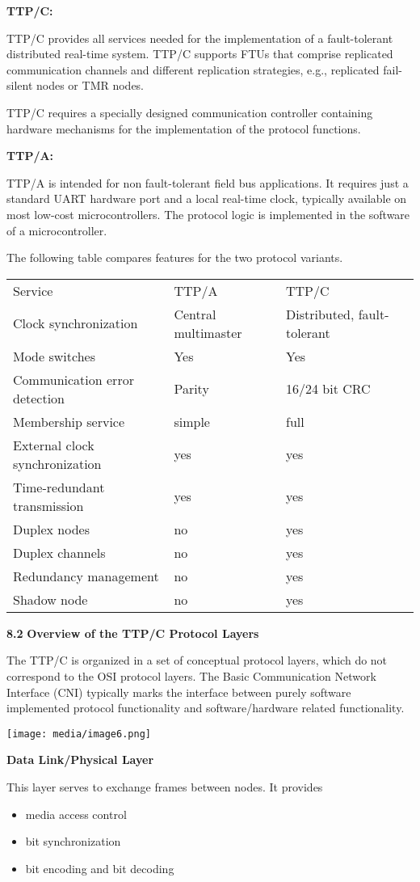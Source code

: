 \textbf{TTP/C:}

TTP/C provides all services needed for the implementation of a
fault-tolerant distributed real-time system. TTP/C supports FTUs that
comprise replicated communication channels and different replication
strategies, e.g., replicated fail-silent nodes or TMR nodes.

TTP/C requires a specially designed communication controller containing
hardware mechanisms for the implementation of the protocol functions.

\textbf{TTP/A:}

TTP/A is intended for non fault-tolerant field bus applications. It
requires just a standard UART hardware port and a local real-time clock,
typically available on most low-cost microcontrollers. The protocol
logic is implemented in the software of a microcontroller.

The following table compares features for the two protocol variants.

\begin{longtable}[c]{@{}lll@{}}
\toprule
Service & TTP/A & TTP/C\tabularnewline
Clock synchronization & Central multimaster & Distributed,
fault-tolerant\tabularnewline
Mode switches & Yes & Yes\tabularnewline
Communication error detection & Parity & 16/24 bit CRC\tabularnewline
Membership service & simple & full\tabularnewline
External clock synchronization & yes & yes\tabularnewline
Time-redundant transmission & yes & yes\tabularnewline
Duplex nodes & no & yes\tabularnewline
Duplex channels & no & yes\tabularnewline
Redundancy management & no & yes\tabularnewline
Shadow node & no & yes\tabularnewline
\bottomrule
\end{longtable}

\textbf{8.2} \protect\hypertarget{teil3}{}{}\textbf{Overview of the
TTP/C Protocol Layers }

The TTP/C is organized in a set of conceptual protocol layers, which do
not correspond to the OSI protocol layers. The Basic Communication
Network Interface (CNI) typically marks the interface between purely
software implemented protocol functionality and software/hardware
related functionality.

\texttt{[image: media/image6.png]}

\textbf{Data Link/Physical Layer}

This layer serves to exchange frames between nodes. It provides

\begin{itemize}
\item
  media access control
\item
  bit synchronization
\item
  bit encoding and bit decoding
\end{itemize}

